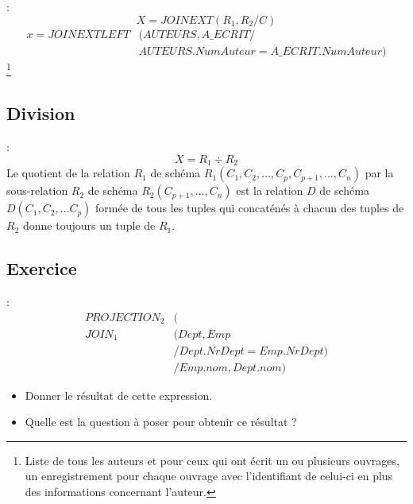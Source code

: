 \documentclass[10pt]{beamer}
\begin{document}
\begin{frame}{\secname : \subsecname}
    $$
        X = JOIN EXT(R_1,R_2 / C)
    $$
    \begin{equation}
        \begin{split}
            x = JOIN EXT LEFT &(AUTEURS, A\_ECRIT  / \\
            & AUTEURS.NumAuteur = A\_ECRIT.NumAuteur)
        \end{split}
    \end{equation}
    \footnote{Liste de tous les auteurs et pour ceux qui ont écrit un ou plusieurs ouvrages, un enregistrement pour chaque ouvrage avec l'identifiant de celui-ci en plus des informations concernant l'auteur.}
\end{frame}
\subsection{Division}
\begin{frame}{\secname : \subsecname}
    $$
        X = R_1 \div R_2
    $$
    Le quotient de la relation $R_1$ de schéma $R_1 (C_1, C_2, …, C_p, C_{p+1}, …, C_n)$ par la sous-relation $R_2$ de schéma $R_2 (C_{p+1}, … , C_n)$ est la relation $D$ de schéma $D (C_1, C_2, … C_p)$ formée de tous les tuples qui concaténés à chacun des tuples de $R_2$ donne toujours un tuple de $R_1$.

\end{frame}
\subsection{Exercice}
\begin{frame}{\secname : \subsecname}
    \begin{equation}
        \begin{split}
            PROJECTION_2 &( \\
            JOIN_1 &(Dept, Emp \\
            & / Dept.NrDept = Emp.NrDept) \\
            & / Emp.nom, Dept.nom  )
        \end{split}
    \end{equation}
    \begin{itemize}
        \item Donner le résultat de cette expression.
        \item Quelle est la question à poser pour obtenir ce résultat ?
    \end{itemize}

\end{frame}


\end{document}
